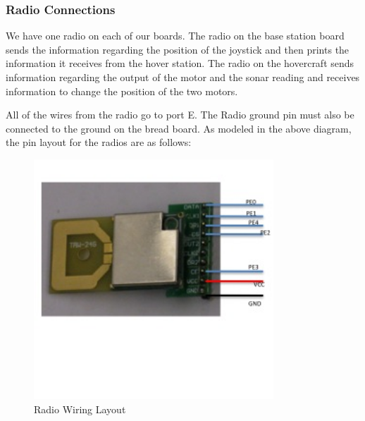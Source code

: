 \subsubsection{Radio Connections}
We have one radio on each of our boards. The radio on the base station board sends the information regarding the position of the joystick and then prints the information it receives from the hover station.  The radio on the hovercraft sends information regarding the output of the motor and the sonar reading and receives information to change the position of the two motors.

All of the wires from the radio go to port E. The Radio ground pin must also be connected to the ground on the bread board. As modeled in the above diagram, the pin layout for the radios are as follows:
\begin{figure}[h]
  \begin{center}
    \includegraphics[width=90mm]{imageSources/radioConnect.png}
  \end{center}
  \caption{Radio Wiring Layout} 
  \label{radioConnect}
\end{figure}

